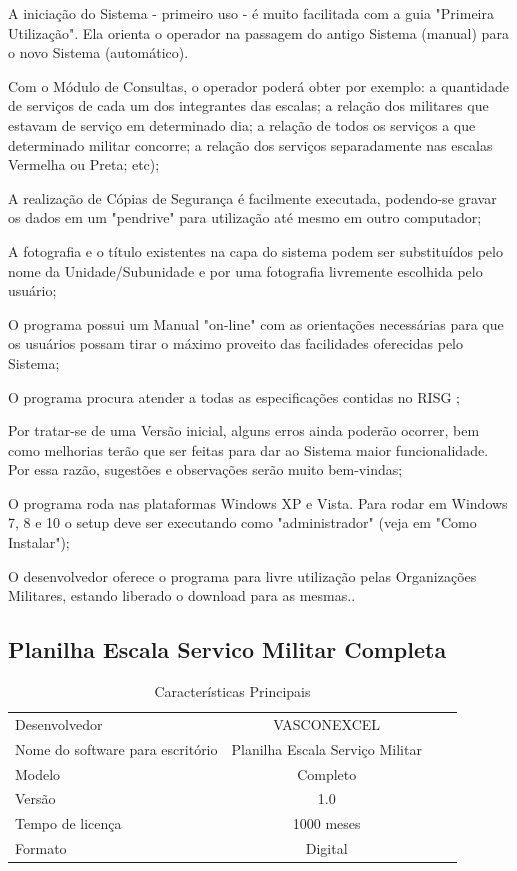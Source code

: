 A iniciação do Sistema - primeiro uso - é muito facilitada com a guia "Primeira Utilização". Ela orienta o operador na passagem do antigo Sistema (manual) para o novo Sistema (automático).

Com o Módulo de Consultas, o operador poderá obter por exemplo: a quantidade de serviços de cada um dos integrantes das escalas; a relação dos militares que estavam de serviço em determinado dia; a relação de todos os serviços a que determinado militar concorre; a relação dos serviços separadamente nas escalas Vermelha ou Preta; etc);

A realização de Cópias de Segurança é facilmente executada, podendo-se gravar os dados em um "pendrive" para utilização até mesmo em outro computador;

A fotografia e o título existentes na capa do sistema podem ser substituídos pelo nome da Unidade/Subunidade e por uma fotografia livremente escolhida pelo usuário;

O programa possui um Manual "on-line" com as orientações necessárias para que os usuários possam tirar o máximo proveito das facilidades oferecidas pelo Sistema;

O programa procura atender a todas as especificações contidas no RISG ;

Por tratar-se de uma Versão inicial, alguns erros ainda poderão ocorrer, bem como melhorias terão que ser feitas para dar ao Sistema maior funcionalidade. Por essa razão, sugestões e observações serão muito bem-vindas;

O programa roda nas plataformas Windows XP e Vista. Para rodar em Windows 7, 8 e 10 o setup deve ser executando como "administrador" (veja em "Como Instalar");

O desenvolvedor oferece o programa para livre utilização pelas Organizações Militares, estando liberado o download para as mesmas.\citep{eloy}.

\subsection{Planilha Escala Servico Militar Completa}

\begin{table}[htb]
\caption{Características Principais}
\label{tb:exemplo}
\centering
\begin{tabular}{|l|c|r|r|} %
\hline
Desenvolvedor & VASCONEXCEL\\
Nome do software para escritório & Planilha Escala Serviço Militar\\
Modelo & Completo\\
Versão & 1.0 \\
Tempo de licença & 1000 meses \\
Formato	& Digital \\
\hline
\end{tabular}
\end{table}

